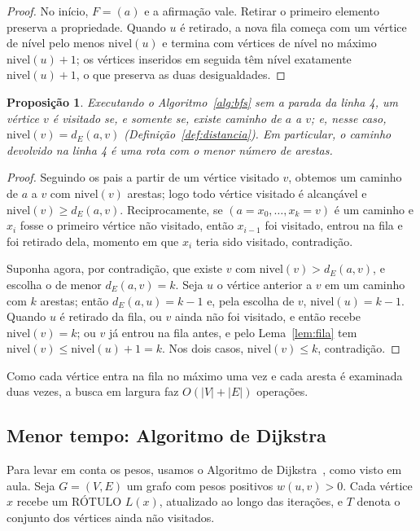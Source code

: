 \documentclass{article}
\theoremstyle{definition}
\theoremstyle{plain}
\newtheorem{proposicao}[definicao]{Proposição}
\newcommand{\dE}{d_E}
\begin{document}
\begin{proof}
No início, $F = (a)$ e a afirmação vale. Retirar o primeiro elemento preserva a
propriedade. Quando $u$ é retirado, a nova fila começa com um vértice de nível
pelo menos $\mathrm{nivel}(u)$ e termina com vértices de nível no máximo
$\mathrm{nivel}(u)+1$; os vértices inseridos em seguida têm nível exatamente
$\mathrm{nivel}(u)+1$, o que preserva as duas desigualdades.
\end{proof}

\begin{proposicao}\label{prop:bfs}
Executando o Algoritmo~\ref{alg:bfs} sem a parada da linha 4, um vértice $v$ é
visitado se, e somente se, existe caminho de $a$ a $v$; e, nesse caso,
$\mathrm{nivel}(v) = \dE(a,v)$ (Definição~\ref{def:distancia}). Em particular, o
caminho devolvido na linha 4 é uma rota com o menor número de arestas.
\end{proposicao}

\begin{proof}
Seguindo os pais a partir de um vértice visitado $v$, obtemos um caminho de $a$ a
$v$ com $\mathrm{nivel}(v)$ arestas; logo todo vértice visitado é alcançável e
$\mathrm{nivel}(v) \ge \dE(a,v)$. Reciprocamente, se $(a = x_0, \dots, x_k = v)$
é um caminho e $x_i$ fosse o primeiro vértice não visitado, então $x_{i-1}$ foi
visitado, entrou na fila e foi retirado dela, momento em que $x_i$ teria sido
visitado, contradição.

Suponha agora, por contradição, que existe $v$ com
$\mathrm{nivel}(v) > \dE(a,v)$, e escolha o de menor $\dE(a,v) = k$. Seja $u$ o
vértice anterior a $v$ em um caminho com $k$ arestas; então $\dE(a,u) = k-1$ e,
pela escolha de $v$, $\mathrm{nivel}(u) = k-1$. Quando $u$ é retirado da fila, ou
$v$ ainda não foi visitado, e então recebe $\mathrm{nivel}(v) = k$; ou $v$ já
entrou na fila antes, e pelo Lema~\ref{lem:fila} tem
$\mathrm{nivel}(v) \le \mathrm{nivel}(u) + 1 = k$. Nos dois casos,
$\mathrm{nivel}(v) \le k$, contradição.
\end{proof}

Como cada vértice entra na fila no máximo uma vez e cada aresta é examinada duas
vezes, a busca em largura faz $O(|V| + |E|)$ operações.

\subsection{Menor tempo: Algoritmo de Dijkstra}

Para levar em conta os pesos, usamos o Algoritmo de Dijkstra~\cite{dijkstra}, como
visto em aula. Seja $G=(V,E)$ um grafo com pesos positivos $w(u,v) > 0$. Cada
vértice $x$ recebe um RÓTULO $L(x)$, atualizado ao longo das iterações, e $T$
denota o conjunto dos vértices ainda não visitados.
\end{document}
